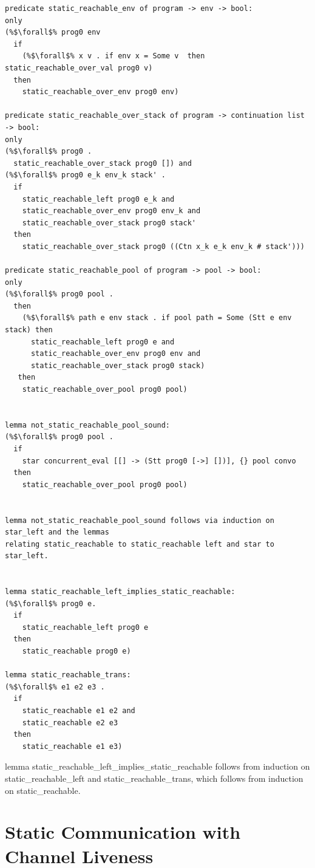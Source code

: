 \documentclass{article}
\begin{document}
\begin{lstlisting}[language=logic, escapechar=\%]
predicate static_reachable_env of program -> env -> bool:
only
(%$\forall$% prog0 env
  if
    (%$\forall$% x v . if env x = Some v  then static_reachable_over_val prog0 v)
  then
    static_reachable_over_env prog0 env)

predicate static_reachable_over_stack of program -> continuation list -> bool:
only
(%$\forall$% prog0 .
  static_reachable_over_stack prog0 []) and
(%$\forall$% prog0 e_k env_k stack' .
  if
    static_reachable_left prog0 e_k and 
    static_reachable_over_env prog0 env_k and
    static_reachable_over_stack prog0 stack' 
  then
    static_reachable_over_stack prog0 ((Ctn x_k e_k env_k # stack')))

predicate static_reachable_pool of program -> pool -> bool:
only
(%$\forall$% prog0 pool .
  then
    (%$\forall$% path e env stack . if pool path = Some (Stt e env stack) then 
      static_reachable_left prog0 e and 
      static_reachable_over_env prog0 env and 
      static_reachable_over_stack prog0 stack)
   then
    static_reachable_over_pool prog0 pool)


lemma not_static_reachable_pool_sound:
(%$\forall$% prog0 pool .
  if
    star concurrent_eval [[] -> (Stt prog0 [->] [])], {} pool convo 
  then
    static_reachable_over_pool prog0 pool)


lemma not_static_reachable_pool_sound follows via induction on star_left and the lemmas
relating static_reachable to static_reachable left and star to star_left.


lemma static_reachable_left_implies_static_reachable:
(%$\forall$% prog0 e. 
  if
    static_reachable_left prog0 e
  then
    static_reachable prog0 e)

lemma static_reachable_trans:
(%$\forall$% e1 e2 e3 .
  if 
    static_reachable e1 e2 and
    static_reachable e2 e3
  then
    static_reachable e1 e3)

\end{lstlisting}


lemma static\_reachable\_left\_implies\_static\_reachable follows from induction on
static\_reachable\_left and static\_reachable\_trans, which follows from induction on
static\_reachable.



\section{Static Communication with Channel Liveness }
\end{document}
